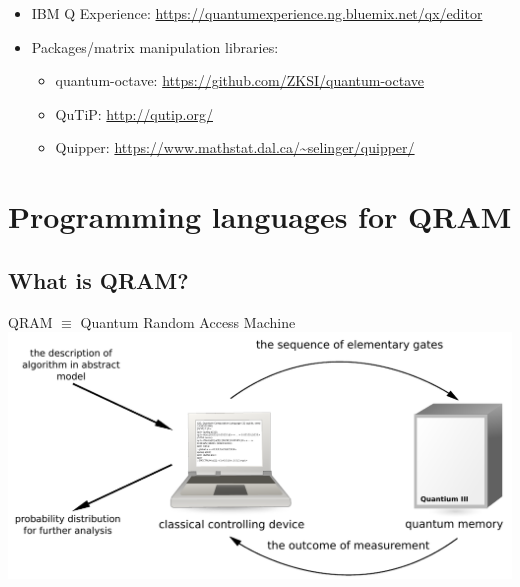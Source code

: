 \documentclass{beamer}
\begin{document}
\begin{frame}{\insertsection}{\insertsubsection}
    \begin{itemize}
    \item IBM Q Experience: 
    {\small\url{https://quantumexperience.ng.bluemix.net/qx/editor}}
    \item Packages/matrix manipulation libraries:
    \begin{itemize}
        \item quantum-octave: 
        {\small \url{https://github.com/ZKSI/quantum-octave}}
        \item QuTiP: {\small\url{http://qutip.org/}}
        \item Quipper: 
        {\small\url{https://www.mathstat.dal.ca/~selinger/quipper/}}
    \end{itemize}
    \end{itemize}
\end{frame}

\section{Programming languages for QRAM}

\subsection{What is QRAM?}
\begin{frame}{\insertsection}{\insertsubsection}
	\begin{center}
	QRAM $\equiv$ Quantum Random Access Machine\\[12pt]
    \includegraphics[width=\textwidth]{pics/qram}
\end{center}
\end{frame}
\end{document}

